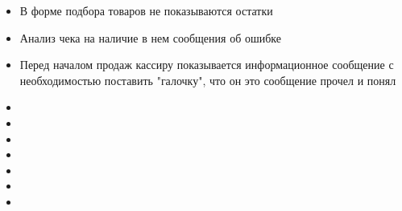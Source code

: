 \begin{itemize}
 	\item В форме подбора товаров не показываются остатки
 	\item Анализ чека на наличие в нем сообщения об ошибке
	\item Перед началом продаж кассиру показывается информационное сообщение с необходимостью поставить "галочку", что он это сообщение прочел и понял
	\item
 	\item
 	\item
 	\item
 	\item
 	\item
 	\item
	
\end{itemize}


